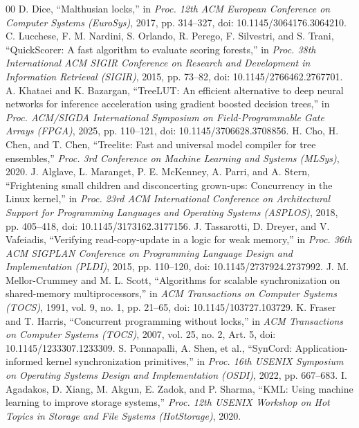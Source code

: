 \documentclass[conference]{IEEEtran}
\begin{document}
\begin{thebibliography}{00}
 D. Dice, ``Malthusian locks,'' in \textit{Proc. 12th ACM European Conference on Computer Systems (EuroSys)}, 2017, pp. 314--327, doi: 10.1145/3064176.3064210.
 C. Lucchese, F. M. Nardini, S. Orlando, R. Perego, F. Silvestri, and S. Trani, ``QuickScorer: A fast algorithm to evaluate scoring forests,'' in \textit{Proc. 38th International ACM SIGIR Conference on Research and Development in Information Retrieval (SIGIR)}, 2015, pp. 73--82, doi: 10.1145/2766462.2767701.
 A. Khataei and K. Bazargan, ``TreeLUT: An efficient alternative to deep neural networks for inference acceleration using gradient boosted decision trees,'' in \textit{Proc. ACM/SIGDA International Symposium on Field-Programmable Gate Arrays (FPGA)}, 2025, pp. 110--121, doi: 10.1145/3706628.3708856.
 H. Cho, H. Chen, and T. Chen, ``Treelite: Fast and universal model compiler for tree ensembles,'' \textit{Proc. 3rd Conference on Machine Learning and Systems (MLSys)}, 2020.
 J. Alglave, L. Maranget, P. E. McKenney, A. Parri, and A. Stern, ``Frightening small children and disconcerting grown-ups: Concurrency in the Linux kernel,'' in \textit{Proc. 23rd ACM International Conference on Architectural Support for Programming Languages and Operating Systems (ASPLOS)}, 2018, pp. 405--418, doi: 10.1145/3173162.3177156.
 J. Tassarotti, D. Dreyer, and V. Vafeiadis, ``Verifying read-copy-update in a logic for weak memory,'' in \textit{Proc. 36th ACM SIGPLAN Conference on Programming Language Design and Implementation (PLDI)}, 2015, pp. 110--120, doi: 10.1145/2737924.2737992.
 J. M. Mellor-Crummey and M. L. Scott, ``Algorithms for scalable synchronization on shared-memory multiprocessors,'' in \textit{ACM Transactions on Computer Systems (TOCS)}, 1991, vol. 9, no. 1, pp. 21--65, doi: 10.1145/103727.103729.
 K. Fraser and T. Harris, ``Concurrent programming without locks,'' in \textit{ACM Transactions on Computer Systems (TOCS)}, 2007, vol. 25, no. 2, Art. 5, doi: 10.1145/1233307.1233309.
 S. Ponnapalli, A. Shen, et al., ``SynCord: Application-informed kernel synchronization primitives,'' in \textit{Proc. 16th USENIX Symposium on Operating Systems Design and Implementation (OSDI)}, 2022, pp. 667--683.
 I. Agadakos, D. Xiang, M. Akgun, E. Zadok, and P. Sharma, ``KML: Using machine learning to improve storage systems,'' \textit{Proc. 12th USENIX Workshop on Hot Topics in Storage and File Systems (HotStorage)}, 2020.

\end{thebibliography}
\end{document}
